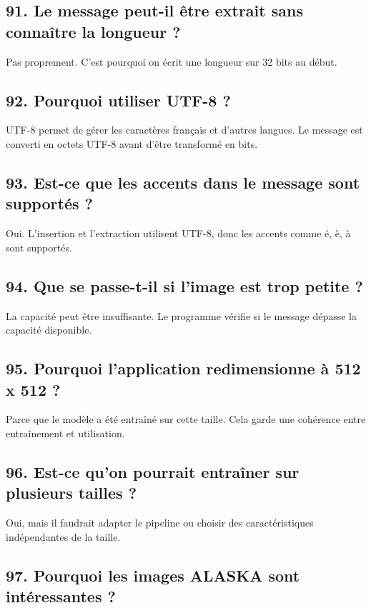 \documentclass[11pt,a4paper]{article}
\begin{document}
\subsection{91. Le message peut-il être extrait sans connaître la longueur ?}

Pas proprement. C'est pourquoi on écrit une longueur sur 32 bits au début.

\subsection{92. Pourquoi utiliser UTF-8 ?}

UTF-8 permet de gérer les caractères français et d'autres langues. Le message est converti en octets UTF-8 avant d'être transformé en bits.

\subsection{93. Est-ce que les accents dans le message sont supportés ?}

Oui. L'insertion et l'extraction utilisent UTF-8, donc les accents comme é, è, à sont supportés.

\subsection{94. Que se passe-t-il si l'image est trop petite ?}

La capacité peut être insuffisante. Le programme vérifie si le message dépasse la capacité disponible.

\subsection{95. Pourquoi l'application redimensionne à 512 x 512 ?}

Parce que le modèle a été entraîné sur cette taille. Cela garde une cohérence entre entraînement et utilisation.

\subsection{96. Est-ce qu'on pourrait entraîner sur plusieurs tailles ?}

Oui, mais il faudrait adapter le pipeline ou choisir des caractéristiques indépendantes de la taille.

\subsection{97. Pourquoi les images ALASKA sont intéressantes ?}
\end{document}

